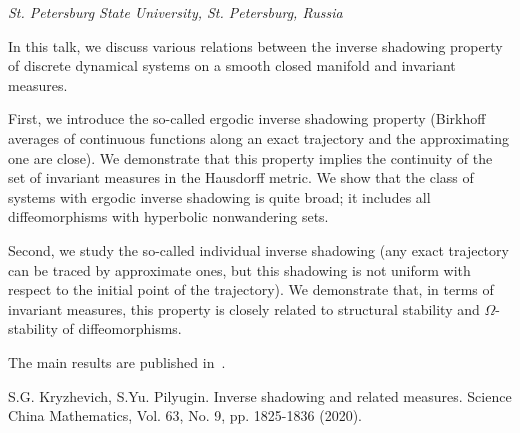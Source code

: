 

\begin{center}
	\maketitle
	{\large\textit{St. Petersburg State University, St. Petersburg, Russia}}
\end{center}


In this talk, we discuss various relations between the inverse
shadowing property of discrete dynamical systems on a smooth
closed manifold and invariant measures.

First, we introduce the so-called ergodic inverse shadowing property (Birk\-hoff
averages of continuous functions along an exact trajectory and the approximating 
one are close). We demonstrate that this property implies the continuity of the set of invariant measures in the Hausdorff metric. We show that the class of systems 
with ergodic inverse shadowing is quite broad; it includes all diffeomorphisms 
with hyperbolic nonwandering sets. 

Second, we study the so-called individual inverse shadowing 
(any exact trajectory can be traced by approximate ones, but this 
shadowing is not uniform with respect to the initial point of the trajectory).
We demonstrate that, in terms of invariant measures,
this property is closely related to structural stability 
and $\Omega$-stability of diffeomorphisms.

The main results are published in~\cite{KP}.

\begin{thebibliography}{99}
	 S.G. Kryzhevich, S.Yu. Pilyugin.  Inverse shadowing and related measures. Science China Mathematics, Vol. 63, No. 9, pp. 1825-1836 (2020). 
\end{thebibliography}

